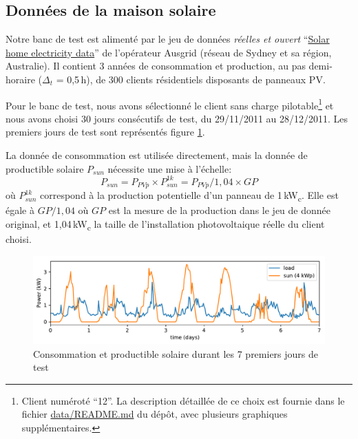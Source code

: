 \documentclass[a4paper,10pt,twocolumn]{article}
\newcommand\sub[1]{\textsubscript{#1}}
\newcommand\kWc{kW\sub{c}{}} %
\begin{document}
\subsection{Données de la maison solaire}
\label{ss:sol_data}

Notre banc de test est alimenté par le jeu de données \emph{réelles et ouvert}
``\href{https://www.ausgrid.com.au/Common/About-us/Corporate-information/Data-to-share/Solar-home-electricity-data.aspx}{Solar home electricity data}''
de l'opérateur Ausgrid (réseau de Sydney et sa région, Australie).
Il contient 3 années de consommation et production, au pas demi-horaire ($\Delta_t$ = 0,5\,h),
de 300 clients résidentiels disposants de panneaux PV.

Pour le banc de test, nous avons sélectionné le client sans charge pilotable\footnote{
  Client numéroté ``12''. La description détaillée de ce choix est fournie dans le fichier \href{https://github.com/pierre-haessig/solarhome-control-bench/blob/master/data/README.md}{data/README.md} du dépôt, avec plusieurs graphiques supplémentaires.
}
et nous avons choisi 30 jours consécutifs de test, du 29/11/2011 au 28/12/2011.
Les premiers jours de test sont représentés figure \ref{fig:testdata}.

La donnée de consommation est utilisée directement, mais
la donnée de productible solaire $P_{sun}$ nécessite une mise à l'échelle:
\begin{equation}
  P_{sun} = P_{PVp} \times P_{sun}^{1k} = P_{PVp}/1,04 \times GP 
\end{equation}
%
où $P_{sun}^{1k}$ correspond à la production potentielle d'un panneau de 1\,\kWc.
Elle est égale à $GP/1,04$ où $GP$ est la mesure de la production
dans le jeu de donnée original, et 1,04\,\kWc{} la taille de l'installation photovoltaique
réelle du client choisi.

\begin{figure}[!ht]
        \begin{center}
                \includegraphics[width=1\columnwidth]{figures/data_week_2011-11-29.pdf}
        \end{center}

        \caption{Consommation et productible solaire durant les 7 premiers jours de test
        }
        \label{fig:testdata}
\end{figure}
\end{document}
